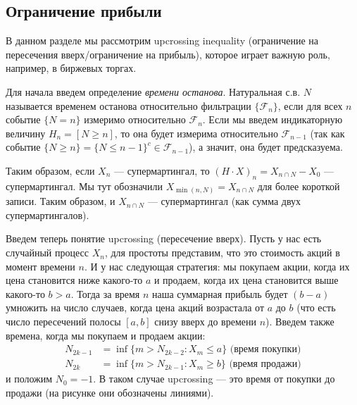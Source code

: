 \documentclass[12pt]{article}
\newcommand\F{\mathcal{F}}
\begin{document}
\subsection{Ограничение прибыли}

В данном разделе мы рассмотрим upcrossing inequality (ограничение на пересечения вверх/ограничение на прибыль), которое играет важную роль, например, в биржевых торгах. 

Для начала введем определение \emph{времени останова}. Натуральная с.в. $N$ называется временем останова относительно фильтрации $\{\F_n\}$, если для всех $n$ событие $\{N = n\}$ измеримо относительно $\F_n$. Если мы введем индикаторную величину $H_n = [N \ge n]$, то она будет измерима относительно $\F_{n - 1}$ (так как событие $\{N \ge n\} = \{N \le n - 1\}^c \in \F_{n - 1}$), а значит, она будет предсказуема. 

Таким образом, если $X_n$ --- супермартингал, то $(H \cdot X)_n = X_{n \cap N} - X_0$ --- супермартингал. Мы тут обозначили $X_{\min(n, N)} = X_{n \cap N}$ для более короткой записи. Таким образом, и $X_{n \cap N}$ --- супермартингал (как сумма двух супермартингалов).

Введем теперь понятие upcrossing (пересечение вверх). Пусть у нас есть случайный процесс $X_n$, для простоты представим, что это стоимость акций в момент времени $n$. И у нас следующая стратегия: мы покупаем акции, когда их цена становится ниже какого-то $a$ и продаем, когда их цена становится выше какого-то $b > a$. Тогда за время $n$ наша суммарная прибыль будет $(b -a)$ умножить на число случаев, когда цена акций возрастала от $a$ до $b$ (что есть число пересечений полосы $[a, b]$ снизу вверх до времени $n$). Введем также времена, когда мы покупаем и продаем акции:
\begin{align*}
  N_{2k - 1} &= \inf\{m > N_{2k - 2}: X_m \le a\} \text{ (время покупки)}\\
  N_{2k} &= \inf\{m > N_{2k - 1}: X_m \ge b\} \text{ (время продажи)}
\end{align*}
и положим $N_0 = -1$. В таком случае upcrossing --- это время от покупки до продажи (на рисунке они обозначены линиями).
\end{document}
